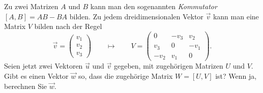 Zu zwei Matrizen $A$ und $B$ kann man den sogenannten {\em Kommutator}
$[A,B]=AB-BA$ bilden.
Zu jedem dreidimensionalen Vektor $\vec v$ kann man eine Matrix $V$
bilden nach der Regel
\[
\vec v
=
\begin{pmatrix}v_1\\v_2\\v_3\end{pmatrix}
\qquad
\mapsto
\qquad
V
=
\begin{pmatrix}
   0&-v_3& v_2\\
 v_3&   0&-v_1\\
-v_2& v_1&   0
\end{pmatrix}.
\]
Seien jetzt zwei Vektoren $\vec u$ und $\vec v$ gegeben, mit zugehörigen
Matrizen $U$ und $V$.
Gibt es einen Vektor $\vec w$ so, dass die zugehörige Matrix $W=[U,V]$ ist?
Wenn ja, berechnen Sie $\vec w$.



